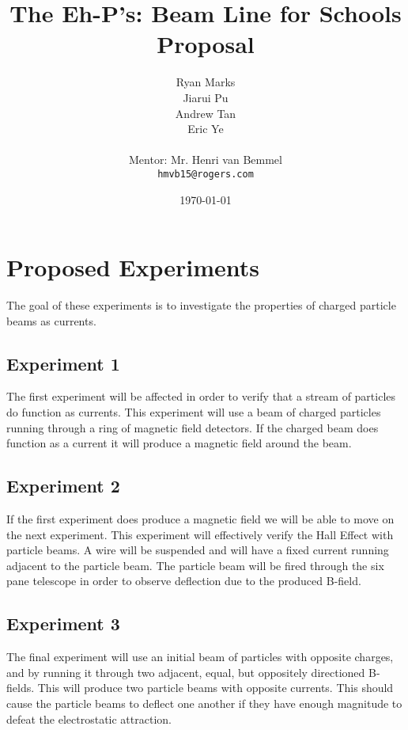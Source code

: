 \documentclass[12pt,letterpaper]{article}
\begin{document}
\title{The Eh-P's: Beam Line for Schools Proposal}
\author{
Ryan Marks\\
Jiarui Pu \\ 
Andrew Tan\\
Eric Ye\\
\\
Mentor: Mr. Henri van Bemmel\\
\normalsize{\texttt{hmvb15@rogers.com}}
}

\date{\today}
\maketitle
\section{Proposed Experiments}
The goal of these experiments is to investigate the properties of charged particle beams as currents.

\subsection{Experiment 1}
The first experiment will be affected in order to verify that a stream of particles do function as currents.
This experiment will use a beam of charged particles running through a ring of magnetic field detectors.
If the charged beam does function as a current it will produce a magnetic field around the beam.

\subsection{Experiment 2}
If the first experiment does produce a magnetic field we will be able to move on the next experiment.
This experiment will effectively verify the Hall Effect with particle beams. 
A wire will be suspended and will have a fixed current running adjacent to the particle beam.
The particle beam will be fired through the six pane telescope in order to observe deflection due to the produced B-field.

\subsection{Experiment 3}
The final experiment will use an initial beam of particles with opposite charges, and by running it through two adjacent, equal, but oppositely directioned B-fields.
This will produce two particle beams with opposite currents. 
This should cause the particle beams to deflect one another if they have enough magnitude to defeat the electrostatic attraction.
\end{document}
